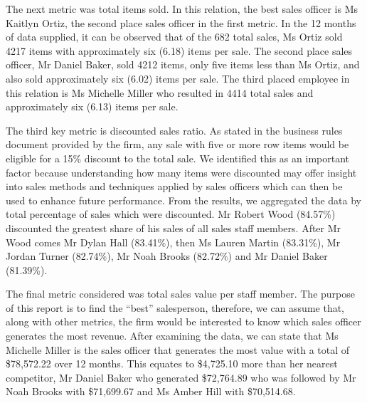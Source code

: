 \documentclass{article}
\begin{document}
    \noindent The next metric was total items sold. In this relation, the best sales officer
    is Ms Kaitlyn Ortiz, the second place sales officer in the first metric. In the 12 months
    of data supplied, it can be observed that of the 682 total sales, Ms Ortiz sold 4217 items
    with approximately six (6.18) items per sale. The second place sales officer, Mr Daniel
    Baker, sold 4212 items, only five items less than Ms Ortiz, and also sold approximately
    six (6.02) items per sale. The third placed employee in this relation is Ms Michelle Miller
    who resulted in 4414 total sales and approximately six (6.13) items per sale.
    \vspace{5mm}
    \par\noindent

    \noindent The third key metric is discounted sales ratio. As stated in the business rules
    document provided by the firm, any sale with five or more row items would be eligible for
    a 15\% discount to the total sale. We identified this as an important factor because
    understanding how many items were discounted may offer insight into sales methods and
    techniques applied by sales officers which can then be used to enhance future performance.
    From the results, we aggregated the data by total percentage of sales which were discounted.
    Mr Robert Wood (84.57\%) discounted the greatest share of his sales of all sales staff
    members. After Mr Wood comes Mr Dylan Hall (83.41\%), then Ms Lauren Martin (83.31\%), Mr 
    Jordan Turner (82.74\%), Mr Noah Brooks (82.72\%) and Mr Daniel Baker (81.39\%).
    \vspace{5mm}
    \par
    
	\noindent The final metric considered was total sales value per staff member. The purpose
	of this report is to find the ``best'' salesperson, therefore, we can assume that, along
	with other metrics, the firm would be interested to know which sales officer generates
	the most revenue. After examining the data, we can state that Ms Michelle Miller is the sales
	officer that generates the most value with a total of \$78,572.22 over 12 months. This
	equates to \$4,725.10 more than her nearest competitor, Mr Daniel Baker who generated
	\$72,764.89 who was followed by Mr Noah Brooks with \$71,699.67 and Ms Amber Hill with 
	\$70,514.68.
	\vspace{5mm}    
	\par
    
\end{document}
